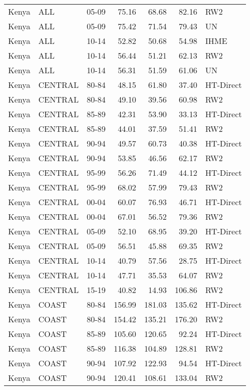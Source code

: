 \begin{longtable}{lllrrrl}
  Kenya & ALL & 05-09 & 75.16 & 68.68 & 82.16 & RW2 \\ 
  Kenya & ALL & 05-09 & 75.42 & 71.54 & 79.43 & UN \\ 
  Kenya & ALL & 10-14 & 52.82 & 50.68 & 54.98 & IHME \\ 
  Kenya & ALL & 10-14 & 56.44 & 51.21 & 62.13 & RW2 \\ 
  Kenya & ALL & 10-14 & 56.31 & 51.59 & 61.06 & UN \\ 
  Kenya & CENTRAL & 80-84 & 48.15 & 61.80 & 37.40 & HT-Direct \\ 
  Kenya & CENTRAL & 80-84 & 49.10 & 39.56 & 60.98 & RW2 \\ 
  Kenya & CENTRAL & 85-89 & 42.31 & 53.90 & 33.13 & HT-Direct \\ 
  Kenya & CENTRAL & 85-89 & 44.01 & 37.59 & 51.41 & RW2 \\ 
  Kenya & CENTRAL & 90-94 & 49.57 & 60.73 & 40.38 & HT-Direct \\ 
  Kenya & CENTRAL & 90-94 & 53.85 & 46.56 & 62.17 & RW2 \\ 
  Kenya & CENTRAL & 95-99 & 56.26 & 71.49 & 44.12 & HT-Direct \\ 
  Kenya & CENTRAL & 95-99 & 68.02 & 57.99 & 79.43 & RW2 \\ 
  Kenya & CENTRAL & 00-04 & 60.07 & 76.93 & 46.71 & HT-Direct \\ 
  Kenya & CENTRAL & 00-04 & 67.01 & 56.52 & 79.36 & RW2 \\ 
  Kenya & CENTRAL & 05-09 & 52.10 & 68.95 & 39.20 & HT-Direct \\ 
  Kenya & CENTRAL & 05-09 & 56.51 & 45.88 & 69.35 & RW2 \\ 
  Kenya & CENTRAL & 10-14 & 40.79 & 57.56 & 28.75 & HT-Direct \\ 
  Kenya & CENTRAL & 10-14 & 47.71 & 35.53 & 64.07 & RW2 \\ 
  Kenya & CENTRAL & 15-19 & 40.82 & 14.93 & 106.86 & RW2 \\ 
  Kenya & COAST & 80-84 & 156.99 & 181.03 & 135.62 & HT-Direct \\ 
  Kenya & COAST & 80-84 & 154.42 & 135.21 & 176.20 & RW2 \\ 
  Kenya & COAST & 85-89 & 105.60 & 120.65 & 92.24 & HT-Direct \\ 
  Kenya & COAST & 85-89 & 116.38 & 104.89 & 128.81 & RW2 \\ 
  Kenya & COAST & 90-94 & 107.92 & 122.93 & 94.54 & HT-Direct \\ 
  Kenya & COAST & 90-94 & 120.41 & 108.61 & 133.04 & RW2 \\ 

\end{longtable}
